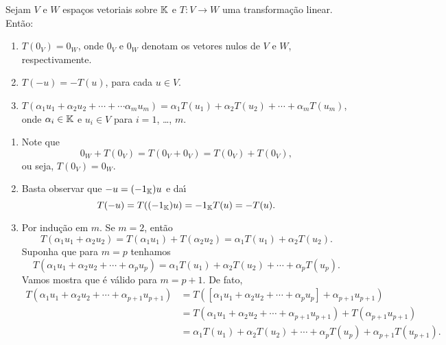 \begin{lema}
  Sejam $V$ e $W$ espa\c{c}os vetoriais sobre $\mathbb{K}$ e $T \colon V \to W$ uma transforma\c{c}\~ao linear. Ent\~ao:
  \begin{enumerate}[label={\roman*})]\label{transformacao_linear_propriedades_basicas}
    \item $T(0_V) = 0_W$, onde $0_V$ e $0_W$ denotam os vetores nulos de $V$ e $W$, respectivamente.

    \item $T(-u) = -T(u)$, para cada $u \in V$.

    \item $T(\alpha_1u_1 + \alpha_2u_2 + \cdots + \cdots \alpha_mu_m) = \alpha_1 T(u_1) + \alpha_2 T(u_2) + \cdots + \alpha_mT(u_m)$, onde $\alpha_i \in \mathbb{K}$ e $u_i \in V$ para $i = 1$, \dots, $m$.
  \end{enumerate}
\end{lema}
\begin{prova}
  \begin{enumerate}[label={\roman*})]
    \item Note que
    \[
      0_W + T(0_V) = T(0_V + 0_V) = T(0_V) + T(0_V),
    \]
    ou seja, $T(0_V) = 0_W$.

    \item Basta observar que $-u = (-1_{\mathbb{K}})u$ e da{\'\i}
    \[
      T(-u) = T((-1_{\mathbb{K}})u) = -1_{\mathbb{K}}T(u) = -T(u).
    \]

    \item Por indu\c{c}\~ao em $m$. Se $m = 2$, ent\~ao
    \[
      T(\alpha_1u_1 + \alpha_2u_2) = T(\alpha_1u_1) + T(\alpha_2u_2) = \alpha_1T(u_1) + \alpha_2T(u_2).
    \]
    Suponha que para $m = p$ tenhamos
    \[
      T(\alpha_1u_1 + \alpha_2u_2 + \cdots + \alpha_pu_p) = \alpha_1T(u_1) + \alpha_2T(u_2) + \cdots + \alpha_pT(u_p).
    \]
    Vamos mostra que \'e v\'alido para $m = p + 1$. De fato,
    \begin{align*}
      T(\alpha_1u_1 + \alpha_2u_2 + \cdots + \alpha_{p + 1}u_{p + 1}) &= T([\alpha_1u_1 + \alpha_2u_2 + \cdots + \alpha_pu_p] + \alpha_{p + 1}u_{p + 1}) \\ &= T(\alpha_1u_1 + \alpha_2u_2 + \cdots + \alpha_{p + 1}u_{p + 1}) + T(\alpha_{p+1}u_{p+1}) \\ &= \alpha_1T(u_1) + \alpha_2T(u_2) + \cdots + \alpha_pT(u_p) + \alpha_{p+1}T(u_{p+1}).
    \end{align*}
  \end{enumerate}
\end{prova}

